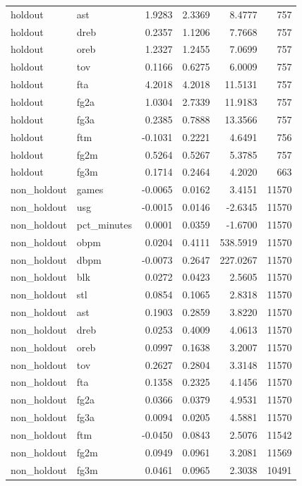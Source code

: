 \begin{table}
\begin{tabular}{llrrrr}
holdout & ast & 1.9283 & 2.3369 & 8.4777 & 757 \\
holdout & dreb & 0.2357 & 1.1206 & 7.7668 & 757 \\
holdout & oreb & 1.2327 & 1.2455 & 7.0699 & 757 \\
holdout & tov & 0.1166 & 0.6275 & 6.0009 & 757 \\
holdout & fta & 4.2018 & 4.2018 & 11.5131 & 757 \\
holdout & fg2a & 1.0304 & 2.7339 & 11.9183 & 757 \\
holdout & fg3a & 0.2385 & 0.7888 & 13.3566 & 757 \\
holdout & ftm & -0.1031 & 0.2221 & 4.6491 & 756 \\
holdout & fg2m & 0.5264 & 0.5267 & 5.3785 & 757 \\
holdout & fg3m & 0.1714 & 0.2464 & 4.2020 & 663 \\
non\_holdout & games & -0.0065 & 0.0162 & 3.4151 & 11570 \\
non\_holdout & usg & -0.0015 & 0.0146 & -2.6345 & 11570 \\
non\_holdout & pct\_minutes & 0.0001 & 0.0359 & -1.6700 & 11570 \\
non\_holdout & obpm & 0.0204 & 0.4111 & 538.5919 & 11570 \\
non\_holdout & dbpm & -0.0073 & 0.2647 & 227.0267 & 11570 \\
non\_holdout & blk & 0.0272 & 0.0423 & 2.5605 & 11570 \\
non\_holdout & stl & 0.0854 & 0.1065 & 2.8318 & 11570 \\
non\_holdout & ast & 0.1903 & 0.2859 & 3.8220 & 11570 \\
non\_holdout & dreb & 0.0253 & 0.4009 & 4.0613 & 11570 \\
non\_holdout & oreb & 0.0997 & 0.1638 & 3.2007 & 11570 \\
non\_holdout & tov & 0.2627 & 0.2804 & 3.3148 & 11570 \\
non\_holdout & fta & 0.1358 & 0.2325 & 4.1456 & 11570 \\
non\_holdout & fg2a & 0.0366 & 0.0379 & 4.9531 & 11570 \\
non\_holdout & fg3a & 0.0094 & 0.0205 & 4.5881 & 11570 \\
non\_holdout & ftm & -0.0450 & 0.0843 & 2.5076 & 11542 \\
non\_holdout & fg2m & 0.0949 & 0.0961 & 3.2081 & 11569 \\
non\_holdout & fg3m & 0.0461 & 0.0965 & 2.3038 & 10491 \\
\bottomrule
\end{tabular}
\end{table}
